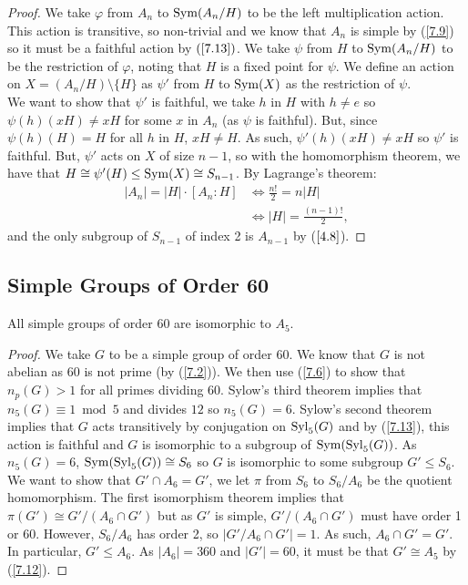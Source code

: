 \begin{proof}
    We take $\varphi$ from $A_n$ to $\operatorname{Sym}(A_n / H)$ to be the left
    multiplication action. This action is transitive, so non-trivial
    and we know that $A_n$ is simple by (\ref{7.9}) so it must be
    a faithful action by $(\ref{7.13})$. We take $\psi$ from
    $H$ to $\operatorname{Sym}(A_n / H)$ to be the restriction of $\varphi$, noting
    that $H$ is a fixed point for $\psi$. We define an action
    on $X = (A_n / H) \setminus \{H\}$ as $\psi'$ from $H$ to
    $\operatorname{Sym}(X)$ as the restriction of $\psi$.
    \\[\baselineskip]
    We want to show that $\psi'$ is faithful, we take $h$ in $H$
    with $h \neq e$ so $\psi(h)(xH) \neq xH$ for some $x$ in
    $A_n$ (as $\psi$ is faithful). But, since $\psi(h)(H) = H$
    for all $h$ in $H$, $xH \neq H$. As such, $\psi'(h)(xH) \neq xH$
    so $\psi'$ is faithful. But, $\psi'$ acts on $X$ of size $n - 1$,
    so with the homomorphism theorem, we have that 
    $H \cong \psi'(H)  \leq \operatorname{Sym}(X) \cong S_{n - 1}$. By Lagrange's 
    theorem: \begin{align*}
        |A_n| = |H| \cdot [A_n : H]
        & \Longleftrightarrow
        \frac{n!}{2} = n|H| \\
        & \Longleftrightarrow
        |H| = \frac{(n - 1)!}{2},
    \end{align*} and the only subgroup of $S_{n - 1}$ of index 2 is
    $A_{n - 1}$ by ($\ref{4.8}$).
\end{proof}

\subsection{Simple Groups of Order 60} \label{7.14}

All simple groups of order 60 are isomorphic to $A_5$.

\begin{proof}
    We take $G$ to be a simple group of order 60. We know that 
    $G$ is not abelian as 60 is not prime (by (\ref{7.2})). 
    We then use (\ref{7.6}) to show that $n_p(G) > 1$ for all primes 
    dividing 60. Sylow's third theorem implies that 
    $n_5(G) \equiv 1 \bmod 5$ and divides $12$ so $n_5(G) = 6$. 
    Sylow's second theorem implies that $G$ acts transitively by 
    conjugation on $\operatorname{Syl}_5(G)$ and by (\ref{7.13}), this action is faithful and $G$ is isomorphic
    to a subgroup of $\operatorname{Sym}(\operatorname{Syl}_5(G))$. As $n_5(G) = 6$,
    $\operatorname{Sym}(\operatorname{Syl}_5(G)) \cong S_6$ so $G$ is isomorphic to some
    subgroup $G' \leq S_6$.
    \\[\baselineskip]
    We want to show that $G' \cap A_6 = G'$, we let $\pi$ from
    $S_6$ to $S_6 / A_6$ be the quotient homomorphism. The first
    isomorphism theorem implies that $\pi(G') \cong G'/(A_6 \cap G')$
    but as $G'$ is simple, $G' / (A_6 \cap G')$ must have order 1 or
    60. However, $S_6 / A_6$ has order 2, so $|G' / A_6 \cap G'| = 1$.
    As such, $A_6 \cap G' = G'$. In particular, $G' \leq A_6$.
    As $|A_6| = 360$ and $|G'| = 60$, it must be that 
    $G' \cong A_5$ by (\ref{7.12}).
\end{proof}

